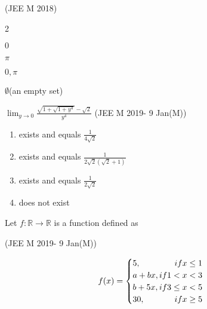 	\hfill{(JEE M 2018)}
	\begin{enumerate}
	\end{enumerate}
	\item  
	$\lim_{y\to0} \frac{\sqrt{1+\sqrt{1+y^4}}-\sqrt{2}}{y^4} $
	\hfill{(JEE M 2019- 9 Jan(M))}
	\begin{enumerate}
		\item exists and equals $\frac{1}{4\sqrt{2}}$
		\item exists and equals $\frac{1}{2\sqrt{2}(\sqrt{2}+1)}$
		\item exists and equals $\frac{1}{2\sqrt{2}}$
		\item does not exist
	\end{enumerate}
\item Let $f : \mathbb{R}\to\mathbb{R}$ is a function defined as

	\hfill{(JEE M 2019- 9 Jan(M))}

	\begin{equation}
	    f(x)= 
	    \begin{cases}
		    5, \hfill{if  x \leq 1} \\
			    a + bx, \hfill{if  1 < x < 3} \\
			    b + 5x, \hfill{if  3 \le x < 5} \\
			    30, \hfill{if  x \geq 5}
	    \end{cases}
	\end{equation}

